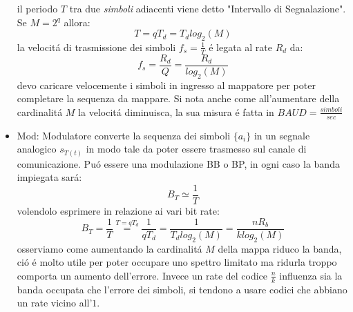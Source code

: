 \begin{itemize}
{\begin{figure}[H]
{\begin{tikzpicture}
                    \end{tikzpicture}
                }
                \hfill
            \end{figure}
            il periodo $T$ tra due \emph{simboli} adiacenti viene detto "Intervallo di Segnalazione". Se $M=2^q$ allora:
            \[
                T = qT_d =T_d log_{2}(M)  
            \]
            la velocitá di trasmissione dei simboli $f_s = \frac{1}{T}$ é legata al rate $R_d$ da:
            \[
                f_s = \frac{R_d}{Q} = \frac{R_d}{log_{2}(M)} 
            \] 
            devo caricare velocemente i simboli in ingresso al mappatore per poter completare la sequenza da mappare. Si nota anche come
            all'aumentare della cardinalitá $M$ la velocitá diminuisca, la sua misura é fatta in $BAUD = \frac{simboli}{sec}$
        }
        \item {Mod: Modulatore converte la sequenza dei simboli $\{a_i\}$ in un segnale analogico $s_{T(t)}$ in modo tale da poter essere trasmesso  
            sul canale di comunicazione. Puó essere una modulazione {\color{blue}BB} o {\color{red}BP}, in ogni caso la banda impiegata sará:
            \[
                B_T \simeq \frac{1}{T}  
            \]
            volendolo esprimere in relazione ai vari bit rate:
            \[
                B_T = \frac{1}{T} \overset{T = qT_d}{=} \frac{1}{qT_d} = \frac{1}{T_d log_2(M)} = \frac{nR_b}{klog_2(M)}     
            \]
            osserviamo come aumentando la cardinalitá $M$ della mappa riduco la banda, ció é molto utile per poter occupare uno spettro limitato ma ridurla troppo
            comporta un aumento dell'errore. Invece un rate del codice $\frac{n}{k}$ influenza sia la banda occupata che l'errore dei simboli, si tendono 
            a usare codici che abbiano un rate vicino all'$1$. 
        }
    \end{itemize}
